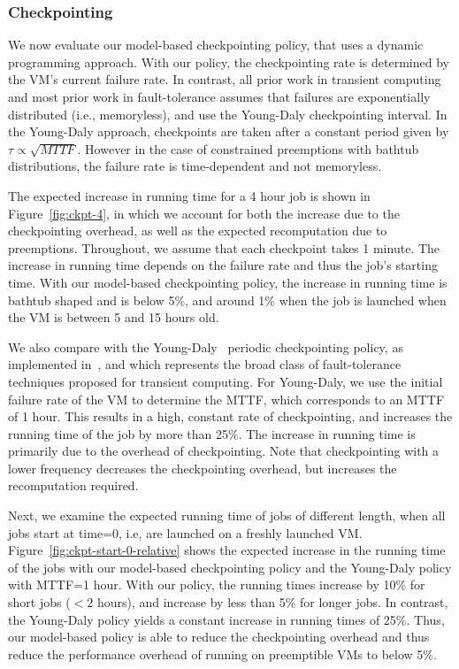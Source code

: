 \subsubsection{Checkpointing}
\label{subsec:eval-ckpt}

We now evaluate our model-based checkpointing policy, that uses a dynamic programming approach.
With our policy, the checkpointing rate is determined by the VM's current failure rate.
In contrast, all prior work in transient computing and most prior work in fault-tolerance assumes that failures are exponentially distributed (i.e., memoryless), and use the Young-Daly checkpointing interval.
In the Young-Daly approach, checkpoints are taken after a constant period given by $\tau \propto \sqrt{MTTF}$.
%
However in the case of constrained preemptions with bathtub distributions, the failure rate is time-dependent and not memoryless. 


The expected increase in running time for a 4 hour job is shown in Figure~\ref{fig:ckpt-4}, in which we account for both the increase due to the checkpointing overhead, as well as the expected recomputation due to preemptions. 
Throughout, we assume that each checkpoint takes 1 minute. 
The increase in running time depends on the failure rate and thus the job's starting time. 
With our model-based checkpointing policy, the increase in running time is bathtub shaped and is below 5\%, and around 1\% when the job is launched when the VM is between 5 and 15 hours old. 

We also compare with the Young-Daly~\cite{daly2006higher} periodic checkpointing policy, as implemented in~\cite{flint, proteus-eur17, marathe2014exploiting}, and which represents the broad class of fault-tolerance techniques proposed for transient computing. 
%
For Young-Daly, we use the initial failure rate of the VM to determine the MTTF, which corresponds to an MTTF of 1 hour. 
This results in a high, constant rate of checkpointing, and increases the running time of the job by more than 25\%.
The increase in running time is primarily due to the overhead of checkpointing. 
Note that checkpointing with a lower frequency decreases the checkpointing overhead, but increases the recomputation required.

Next, we examine the expected running time of jobs of different length, when all jobs start at time=0, i.e, are launched on a freshly launched VM. 
Figure~\ref{fig:ckpt-start-0-relative} shows the expected increase in the running time of the jobs with our model-based checkpointing policy and the Young-Daly policy with MTTF=1 hour.
With our policy, the running times increase by 10\% for short jobs ($<2$  hours), and increase by less than 5\% for longer jobs.
In contrast, the Young-Daly policy yields a constant increase in running times of 25\%. 
Thus, our model-based policy is able to reduce the checkpointing overhead and thus reduce the performance overhead of running on preemptible VMs to below 5\%. 

